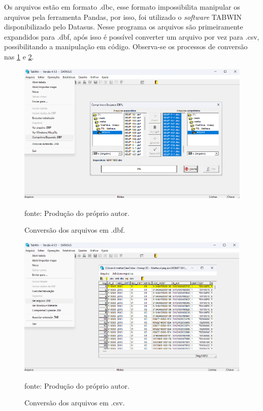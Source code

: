 \documentclass[
  12pt,		%
  a4paper,	%
  openright,%
  oneside,	%
  chapter=TITLE,		%
  section=TITLE,		%
  english,	%
  french,	%
  spanish,	%
  brazil	%
]{abntex2}
\begin{document}
    Os arquivos estão em formato .dbc, esse formato impossibilita manipular os arquivos pela ferramenta Pandas, por isso, 
    foi utilizado o \textit{software} TABWIN disponibilizado pelo Datasus. Nesse programa os arquivos são primeiramente
    expandidos para .dbf, após isso é possível converter um arquivo por vez para .csv, possibilitando a manipulação
    em código. Observa-se os processos de conversão nas \ref*{dbf_datasus} e \ref*{csv_datasus}.

    \begin{figure}[ht]
        \centering
        \caption{Conversão dos arquivos em .dbf.}
        \includegraphics[width=12cm]{../reports/figures/tabwin_process.png}
        \label{dbf_datasus}
        \par
        {\small fonte: Produção do próprio autor.}
    \end{figure}

    \begin{figure}[ht]
        \centering
        \caption{Conversão dos arquivos em .csv.}
        \includegraphics[width=12cm]{../reports/figures/csv.png}
        \label{csv_datasus}
        \par
        {\small fonte: Produção do próprio autor.}
    \end{figure}
\end{document}
